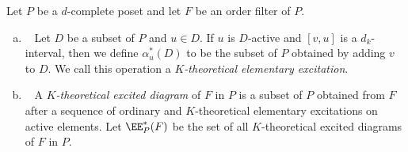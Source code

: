 \begin{defi}
\label{def:K-excited}
Let $P$ be a $d$-complete poset and let $F$ be an order filter of $P$.
\begin{enumerate}[(a)]
\item~\label{defi3.9_a} %
Let $D$ be a subset of $P$ and $u \in D$.
If $u$ is $D$-active and $[v,u]$ is a $d_k$-interval, 
then we define $\alpha^*_u(D)$ to be the subset of $P$ obtained by 
adding $v$ to $D$.
We call this operation a \emph{$K$-theoretical elementary excitation}.
\item~\label{defi3.9_b} %
A \emph{$K$-theoretical excited diagram} of $F$ in $P$ is a subset of $P$ 
obtained from $F$ after a sequence of ordinary and $K$-theoretical elementary excitations on active elements. 
Let $\EE^*_P(F)$ be the set of all $K$-theoretical excited diagrams of $F$ in $P$.
\end{enumerate}
\end{defi}


